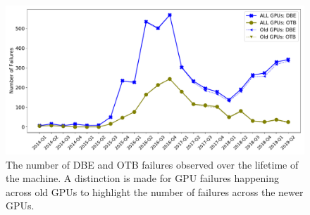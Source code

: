\begin{figure}[bt]
  \begin{center}
    \includegraphics[width=\columnwidth]{figs/NumFailures_Quarterly_newOld.pdf}
  \end{center}
  \caption{The number of DBE and OTB failures observed over the lifetime of the machine.
A distinction is made for GPU failures happening across old GPUs to highlight the number 
of failures across the newer GPUs.}
  \label{fig:NumFails_sys}
\end{figure}
